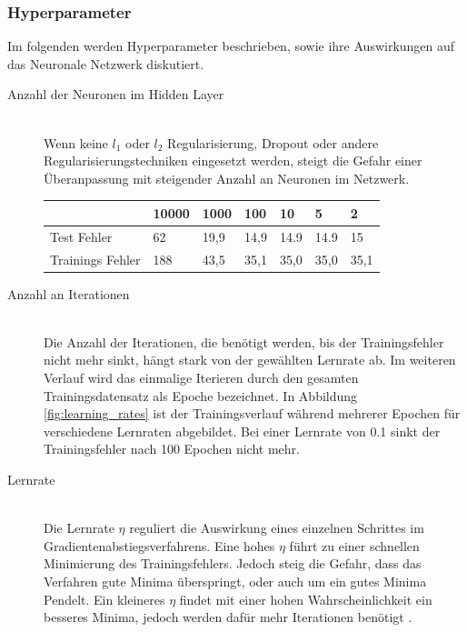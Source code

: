\subsubsection{Hyperparameter}
Im folgenden werden Hyperparameter beschrieben, sowie ihre Auswirkungen auf das Neuronale Netzwerk diskutiert.
\begin{description}
	\item[Anzahl der Neuronen im Hidden Layer]\hfill \\
	Wenn keine $l_1$ oder $l_2$ Regularisierung, Dropout \cite{dropout} oder andere Regularisierungstechniken eingesetzt werden, steigt die Gefahr einer Überanpassung mit steigender Anzahl an Neuronen im Netzwerk.   
	\begin{table}[ht]
		\centering
		\begin{tabular}{l|llllll}
			& 10000 & 1000 & 100  & 10   & 5    & 2    \\ \hline
			Test Fehler      & 62    & 19,9 & 14,9 & 14.9 & 14.9 & 15   \\
			Trainings Fehler & 188   & 43,5 & 35,1 & 35,0 & 35,0 & 35,1
		\end{tabular}
	\end{table}
	
	\item[Anzahl an Iterationen]\hfill \\
	Die Anzahl der Iterationen, die benötigt werden, bis der Trainingsfehler nicht mehr sinkt, hängt stark von der gewählten Lernrate ab. Im weiteren Verlauf wird das einmalige Iterieren durch den gesamten Trainingsdatensatz als Epoche bezeichnet. In Abbildung \ref*{fig:learning_rates} ist der Trainingsverlauf während mehrerer Epochen für verschiedene Lernraten abgebildet. Bei einer Lernrate von 0.1 sinkt der Trainingsfehler nach 100 Epochen nicht mehr.
	
	\item[Lernrate]\hfill \\
	Die Lernrate $\eta$ reguliert die Auswirkung eines einzelnen Schrittes im Gradientenabstiegsverfahrens. Eine hohes $\eta$ führt zu einer schnellen Minimierung des Trainingsfehlers. Jedoch steig die Gefahr, dass das Verfahren gute Minima überspringt, oder auch um ein gutes Minima Pendelt. Ein kleineres $\eta$ findet mit einer hohen Wahrscheinlichkeit ein besseres Minima, jedoch werden dafür mehr Iterationen benötigt \cite{neuronalenetze}.
	

\end{description}
